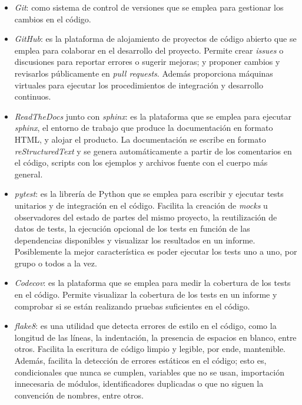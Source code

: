 \begin{itemize}
      \item \textit{Git}: como sistema de control de versiones que se emplea para gestionar los cambios en el código.
      \item \textit{GitHub}: es la plataforma de alojamiento de proyectos de código abierto que se emplea para colaborar en el desarrollo del proyecto. Permite crear \textit{issues} o discusiones para reportar errores o sugerir mejoras; y proponer cambios y revisarlos públicamente en \textit{pull requests}. Además proporciona máquinas virtuales para ejecutar los procedimientos de integración y desarrollo continuos.
      \item \textit{ReadTheDocs} junto con \textit{sphinx}: es la plataforma que se emplea para ejecutar \textit{sphinx}, el entorno de trabajo que produce la documentación en formato HTML, y alojar el producto. La documentación se escribe en formato \textit{reStructuredText} y se genera automáticamente a partir de los comentarios en el código, scripts con los ejemplos y archivos fuente con el cuerpo más general.
      \item \textit{pytest}: es la librería de Python que se emplea para escribir y ejecutar tests unitarios y de integración en el código. Facilita la creación de \textit{mocks} u observadores del estado de partes del mismo proyecto, la reutilización de datos de tests, la ejecución opcional de los tests en función de las dependencias disponibles y visualizar los resultados en un informe. Posiblemente la mejor característica es poder ejecutar los tests uno a uno, por grupo o todos a la vez.
      \item \textit{Codecov}: es la plataforma que se emplea para medir la cobertura de los tests en el código. Permite visualizar la cobertura de los tests en un informe y comprobar si se están realizando pruebas suficientes en el código.
      \item \textit{flake8}: es una utilidad que detecta errores de estilo en el código, como la longitud de las líneas, la indentación, la presencia de espacios en blanco, entre otros. Facilita la escritura de código limpio y legible, por ende, mantenible.
      Además, facilita la detección de errores estáticos en el código; esto es, condicionales que nunca se cumplen, variables que no se usan, importación innecesaria de módulos, identificadores duplicadas o que no siguen la convención de nombres, entre otros.

\end{itemize}

